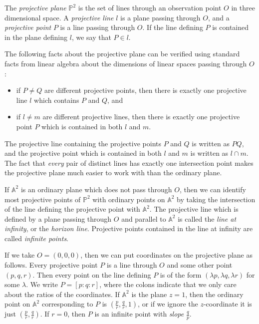 \begin{defn} The \emph{projective plane} $\mathbb{P}^2$ is the set of lines through an observation point $O$ in three dimensional space. A \emph{projective line} $l$ is a plane passing through $O$, and a \emph{projective point} $P$ is a line passing through $O$. If the line defining $P$ is contained in the plane defining $l$, we say that $P\in l$.
\end{defn}

The following facts about the projective plane can be verified using standard facts from linear algebra about the dimensions of linear spaces passing through $O$:
\begin{itemize}
\item if $P \ne Q$ are different projective points, then there is exactly one projective line $l$ which contains $P$ and $Q$, and
\item if $l \ne m$ are different projective lines, then there is exactly one projective point $P$ which is contained in both $l$ and $m$.
\end{itemize}
The projective line containing the projective points $P$ and $Q$ is written as $PQ$, and the projective point which is contained in both $l$ and $m$ is written as $l \cap m$. The fact that \emph{every} pair of distinct lines has exactly one intersection point makes the projective plane much easier to work with than the ordinary plane.

If $\mathbb{A}^2$ is an ordinary plane which does not pass through $O$, then we can identify most projective points of $\mathbb{P}^2$ with ordinary points on $\mathbb{A}^2$ by taking the intersection of the line defining the projective point with $\mathbb{A}^2$. The projective line which is defined by a plane passing through $O$ and parallel to $\mathbb{A}^2$ is called the \emph{line at infinity}, or the \emph{horizon line}. Projective points contained in the line at infinity are called \emph{infinite points}.

If we take $O = (0,0,0)$, then we can put coordinates on the projective plane as follows. Every projective point $P$ is a line through $O$ and some other point $(p,q,r)$. Then every point on the line defining $P$ is of the form $(\lambda p,\lambda q,\lambda r)$ for some $\lambda$. We write $P = [p:q:r]$, where the colons indicate that we only care about the ratios of the coordinates. If $\mathbb{A}^2$ is the plane $z=1$, then the ordinary point on $\mathbb{A}^2$ corresponding to $P$ is $(\frac{p}{r},\frac{q}{r},1)$, or if we ignore the $z$-coordinate it is just $(\frac{p}{r},\frac{q}{r})$. If $r = 0$, then $P$ is an infinite point with \emph{slope} $\frac{q}{p}$.

